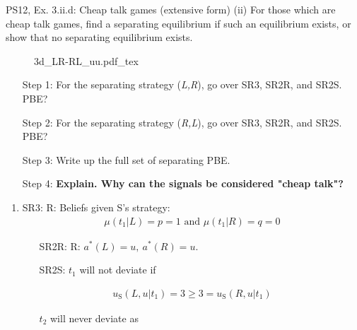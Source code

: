 \begin{frame}{PS12, Ex. 3.ii.d: Cheap talk games (extensive form)}
    (ii) For those which are cheap talk games, find a separating equilibrium if such an equilibrium exists, or show that no separating equilibrium exists.\vspace{-10pt}
    \begin{multicols}{2}
      \begin{figure}[!h]
        \center{}
        {3d_LR-RL_uu.pdf_tex}
      \end{figure}\vspace{-6pt}
      \begin{itemize}
        \item[Step 1:] For the separating strategy (\textit{L,R}), go over SR3, SR2R, and SR2S. PBE?
        \item[Step 2:] For the separating strategy (\textit{R,L}), go over SR3, SR2R, and SR2S. PBE?
        \item[Step 3:] Write up the full set of separating PBE.
        \item[Step 4:] \textbf{Explain. Why can the signals be considered "cheap talk"?}
      \end{itemize}
      \vfill\null\columnbreak
      \begin{enumerate}
        \item SR3: R: Beliefs given S's strategy:\vspace{-8pt}
        \begin{align*}
          \mu(t_1|L)=p=1\text{ and }\mu(t_1|R)=q=0
        \end{align*}\vspace{-18pt}
        \begin{itemize}\normalsize
          \item[SR2R:] R: $a^*(L)=u,\ a^*(R)=u$.
          \item[SR2S:] $t_1$ will not deviate if
        \end{itemize}\vspace{-10pt}
        \begin{align*}
          u_\text{S}(L,u|t_1)=3\geq 3=u_\text{S}(R,u|t_1)
        \end{align*}\vspace{-18pt}
        \begin{itemize}\normalsize
          \item[] $t_2$ will never deviate as
        \end{itemize}\vspace{-10pt}

\end{enumerate}
\end{multicols}
\end{frame}
